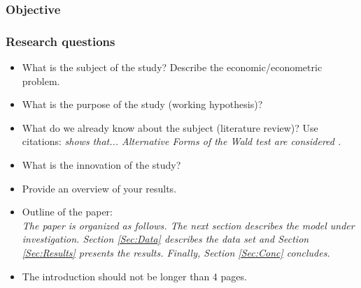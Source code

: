 \subsubsection{Objective}



\subsubsection{Research questions}




\begin{itemize}

    \item What is the subject of the study? Describe the
        economic/econometric problem.

    \item What is the purpose of the study (working hypothesis)?

    \item What do we already know about the subject (literature
        review)? Use citations: {\it \citet{Gallant:87} shows that...
        Alternative Forms of the Wald test are considered
        \citep{Breusch&Schmidt:88}.}

    \item What is the innovation of the study?

    \item Provide an overview of your results.


    \item Outline of the paper:\\
        {\it The paper is organized as follows. The next section describes the
        model under investigation. Section \ref{Sec:Data} describes the data set
        and Section \ref{Sec:Results} presents the results. Finally, Section
        \ref{Sec:Conc} concludes.}

    \item The introduction should not be longer than 4 pages.

\end{itemize}
